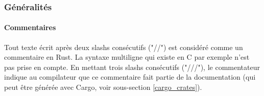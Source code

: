 \documentclass[a4paper, 12pt]{article}
\begin{document}
\subsubsection{Généralités}

\paragraph{Commentaires}
Tout texte écrit après deux slashs consécutifs ("//") est considéré comme un commentaire en Rust.
La syntaxe multiligne qui existe en C par exemple n'est pas prise en compte. En mettant trois slashs 
consécutifs ("///"), le commentateur indique au compilateur que ce commentaire fait partie de la 
documentation (qui peut être générée avec Cargo, voir sous-section \ref{cargo_crates}).
\end{document}
